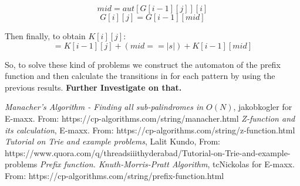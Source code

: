 \documentclass{IEEEtran}
\begin{document}
        $$mid = aut[G[i-1][j]][i]$$
        $$G[i][j]=G[i-1][mid]$$
        \par Then finally, to obtain $K[i][j]$:
        $$=K[i-1][j]+(mid==|s|)+K[i-1][mid]$$
        \par So, to solve these kind of problems we construct the automaton of the prefix function and then calculate the transitions in for each pattern by using the previous results. \textbf{Further Investigate on that.}
    \begin{thebibliography}{}
      \textit{Manacher's Algorithm - Finding all sub-palindromes in $O(N)$},
      jakobkogler for E-maxx.
      From: https://cp-algorithms.com/string/manacher.html
      \textit{Z-function and its calculation},
      E-maxx.
      From: https://cp-algorithms.com/string/z-function.html
      \textit{Tutorial on Trie and example problems},
      Lalit Kundo,
      From: https://www.quora.com/q/threadsiiithyderabad/Tutorial-on-Trie-and-example-problems
      \textit{Prefix function. Knuth-Morris-Pratt Algorithm},
      tcNickolas for E-maxx.
      From: https://cp-algorithms.com/string/prefix-function.html
  \end{thebibliography}
\end{document}
